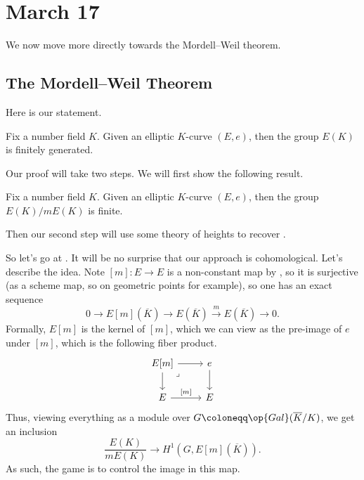 \documentclass[../notes.tex]{subfiles}
\begin{document}
\section{March 17}

We now move more directly towards the Mordell--Weil theorem.

\subsection{The Mordell--Weil Theorem}
Here is our statement.
\begin{theorem} \label{thm:mw}
	Fix a number field $K$. Given an elliptic $K$-curve $(E,e)$, then the group $E(K)$ is finitely generated.
\end{theorem}
Our proof will take two steps. We will first show the following result.
\begin{theorem} \label{thm:weak-mw}
	Fix a number field $K$. Given an elliptic $K$-curve $(E,e)$, then the group $E(K)/mE(K)$ is finite.
\end{theorem}
Then our second step will use some theory of heights to recover .

So let's go at . It will be no surprise that our approach is cohomological. Let's describe the idea. Note $[m]\colon E\to E$ is a non-constant map by , so it is surjective (as a scheme map, so on geometric points for example), so one has an exact sequence
\[0\to E[m](\overline K)\to E(\overline K)\stackrel m\to E(\overline K)\to0.\]
Formally, $E[m]$ is the kernel of $[m]$, which we can view as the pre-image of $e$ under $[m]$, which is the following fiber product.
\[\begin{tikzcd}
	{E[m]} & e \\
	E & E
	\arrow["{[m]}", from=2-1, to=2-2]
	\arrow[from=1-2, to=2-2]
	\arrow[from=1-1, to=1-2]
	\arrow[from=1-1, to=2-1]
	\arrow["\lrcorner"{anchor=center, pos=0.125}, draw=none, from=1-1, to=2-2]
\end{tikzcd}\]
Thus, viewing everything as a module over $G\coloneqq\op{Gal}(\overline K/K)$, we get an inclusion
\[\frac{E(K)}{mE(K)}\to H^1\left(G,E[m](\overline K)\right).\]
As such, the game is to control the image in this map.
\end{document}
